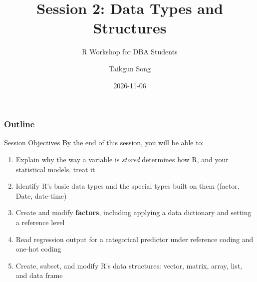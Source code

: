 \documentclass[
  ignorenonframetext,
  aspectratio=169,
]{beamer}
\title{Session 2: Data Types and Structures}
\subtitle{R Workshop for DBA Students}
\author{Taikgun Song}
\date{2026-11-06}
\providecommand{\tightlist}{%
  \setlength{\itemsep}{0pt}\setlength{\parskip}{0pt}}\usepackage{longtable,booktabs,array}
\renewcommand*\contentsname{Table of contents}
\newcommand\contentsname{Table of contents}
\begin{document}
\frame{\titlepage}
\ifdefined\Shaded\renewenvironment{Shaded}{\begin{tcolorbox}[breakable, sharp corners, enhanced, frame hidden, borderline west={3pt}{0pt}{shadecolor}, interior hidden, boxrule=0pt]}{\end{tcolorbox}}\fi

\renewcommand*\contentsname{Outline}
\begin{frame}[allowframebreaks]
  \frametitle{Outline}
  \tableofcontents[hideallsubsections]
\end{frame}
\begin{frame}
\end{frame}

\begin{frame}{Session Objectives}
\protect\hypertarget{session-objectives}{}
By the end of this session, you will be able to:

\begin{enumerate}
\tightlist
\item
  Explain why the way a variable is \emph{stored} determines how R, and
  your statistical models, treat it
\item
  Identify R's basic data types and the special types built on them
  (factor, Date, date-time)
\item
  Create and modify \textbf{factors}, including applying a data
  dictionary and setting a reference level
\item
  Read regression output for a categorical predictor under reference
  coding and one-hot coding
\item
  Create, subset, and modify R's data structures: vector, matrix, array,
  list, and data frame
\end{enumerate}
\end{frame}
\end{document}
